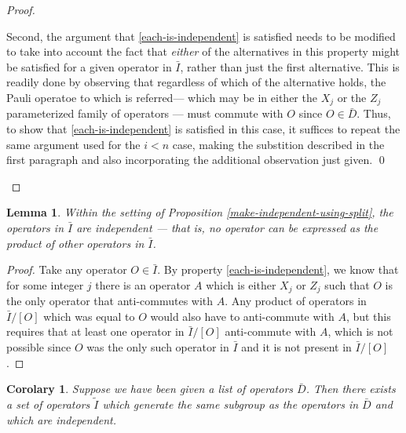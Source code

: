 \documentclass[twocolumn,showpacs,preprintnumbers,amsmath,amssymb,nofootinbib,pra,floatfix]{revtex4}
\newtheorem{lemma}{Lemma}
\newtheorem{corolary}{Corolary}
\begin{document}
\begin{proof}
\begin{description}
Second, the argument that \ref{each-is-independent} is satisfied needs to be modified to take into account the fact that \emph{either} of the alternatives in this property might be satisfied for a given operator in $\bar I$, rather than just the first alternative.  This is readily done by observing that regardless of which of the alternative holds, the Pauli operatoe to which is referred--- which may be in either the $X_j$ or the $Z_j$ parameterized family of operators --- must commute with $O$ since $O\in\bar D$.  Thus, to show that \ref{each-is-independent} is satisfied in this case, it suffices to repeat the same argument used for the $i<n$ case, making the substition described in the first paragraph and also incorporating the additional observation just given. \qed
\end{description}
\end{proof}

\begin{lemma}
\label{resulting-operators-are-independent}
Within the setting of Proposition \ref{make-independent-using-split}, the operators in $\bar I$ are independent --- that is, no operator can be expressed as the product of other operators in $\bar I$.
\end{lemma}

\begin{proof}
Take any operator $O\in\bar I$.  By property \ref{each-is-independent}, we know that for some integer $j$ there is an operator $A$ which is either $X_j$ or $Z_j$ such that $O$ is the only operator that anti-commutes with $A$.  Any product of operators in $\bar I\slash [O]$ which was equal to $O$ would also have to anti-commute with $A$, but this requires that at least one operator in $\bar I\slash [O]$ anti-commute with $A$, which is not possible since $O$ was the only such operator in $\bar I$ and it is not present in $\bar I\slash [O]$.
\end{proof}

\begin{corolary}
\label{corolary-make-independent-using-split}
Suppose we have been given a list of operators $\bar D$.  Then there exists a set of operators $\tilde I$ which generate the same subgroup as the operators in $\bar D$ and which are independent.
\end{corolary}
\end{document}

